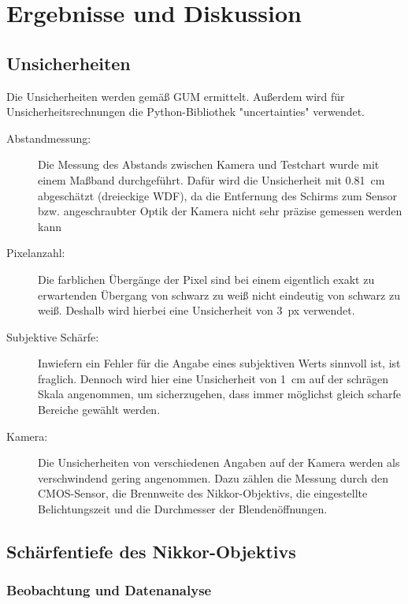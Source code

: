 \documentclass[
	a4paper,
	12pt,
	pagesize,
	ngerman
]{scrartcl}
\begin{document}
	\section{Ergebnisse und Diskussion}
	
	\subsection{Unsicherheiten} %
	Die Unsicherheiten werden gemäß GUM ermittelt. 
	Außerdem wird für Unsicherheitsrechnungen die Python-Bibliothek "uncertainties" verwendet.
	\begin{description}
		\item[Abstandmessung:] Die Messung des Abstands zwischen Kamera und Testchart wurde mit einem Maßband durchgeführt. 
			Dafür wird die Unsicherheit mit \SI{0,81}{cm} abgeschätzt (dreieckige WDF), da die Entfernung des Schirms zum Sensor bzw. angeschraubter Optik der Kamera nicht sehr präzise gemessen werden kann
		\item[Pixelanzahl:] Die farblichen Übergänge der Pixel sind bei einem eigentlich exakt zu erwartenden Übergang von schwarz zu weiß nicht eindeutig von schwarz zu weiß. %
			Deshalb wird hierbei eine Unsicherheit von \SI{3}{px} verwendet.
		\item[Subjektive Schärfe:] Inwiefern ein Fehler für die Angabe eines subjektiven Werts sinnvoll ist, ist fraglich. %
			Dennoch wird hier eine Unsicherheit von \SI{1}{cm} auf der schrägen Skala angenommen, um sicherzugehen, dass immer möglichst gleich scharfe Bereiche gewählt werden. 
		\item[Kamera:] Die Unsicherheiten von verschiedenen Angaben auf der Kamera werden als verschwindend gering angenommen.
			Dazu zählen die Messung durch den CMOS-Sensor, die Brennweite des Nikkor-Objektivs, die eingestellte Belichtungszeit und die Durchmesser der Blendenöffnungen. %
	\end{description} 

	\subsection{Schärfentiefe des Nikkor-Objektivs}
	\subsubsection{Beobachtung und Datenanalyse}
\end{document}

